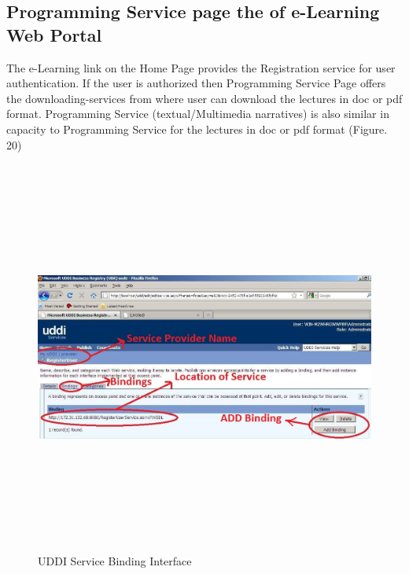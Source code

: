 \subsection{Programming Service page the of e-Learning Web Portal}
The e-Learning link on the Home Page provides the Registration service for user authentication. If the user is authorized then Programming Service Page offers the downloading-services from where user can download the lectures in doc or pdf format.
Programming Service (textual/Multimedia narratives) is also similar in capacity to Programming Service for the lectures in doc or pdf format (Figure. 20) 
\begin{figure}[h!]
 \centering
 \includegraphics[width=16cm,height=13cm]{uddi_service_binding_interface.jpg}
 \caption{UDDI Service Binding Interface}
\end{figure}

